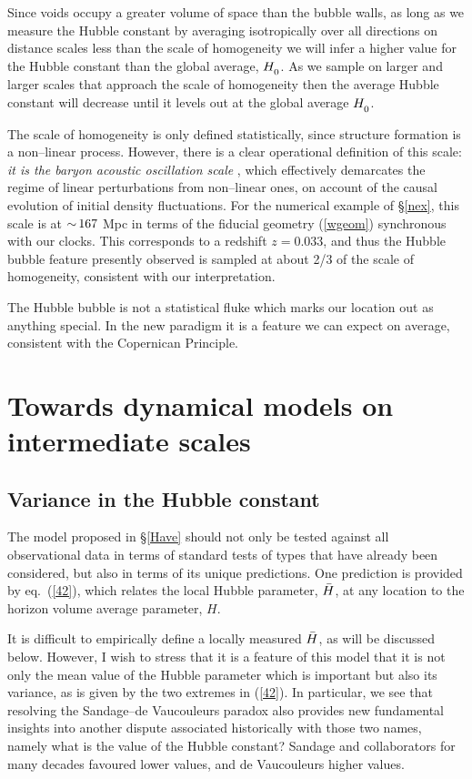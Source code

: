 \documentclass[12pt]{article}
\begin{document}
Since voids occupy a greater volume of space than the bubble walls, as
long as we measure the Hubble constant by averaging isotropically over all
directions on distance scales less than the scale of homogeneity we will
infer a higher value for the Hubble constant than the global average, $\Hm$.
As we sample on larger and larger scales that approach the scale of homogeneity
then the average Hubble constant will decrease until it levels out at
the global average $\Hm$.

The scale of homogeneity is only defined statistically, since structure
formation is a non--linear process. However, there is a clear operational
definition of this scale: {\em it is the baryon acoustic oscillation scale}
\cite{bao}, which effectively demarcates the regime of linear
perturbations from non--linear ones, on account of the causal evolution
of initial density fluctuations. For the numerical example of \S\ref{nex},
this scale is at $\mathop{\sim}\limits167$ Mpc in terms of the fiducial geometry
(\ref{wgeom}) synchronous with our clocks. This corresponds to a redshift
$z=0.033$, and thus the Hubble bubble feature presently observed is
sampled at about 2/3 of the scale of homogeneity, consistent with our
interpretation.

The Hubble bubble is not a statistical fluke which marks our location
out as anything special. In the new paradigm it is a feature we can
expect on average, consistent with the Copernican Principle.

\section{Towards dynamical models on intermediate scales\label{Newton}}

\subsection{Variance in the Hubble constant}

The model proposed in \S\ref{Have} should not only be tested against
all observational data in terms of standard tests of types that have
already been considered, but also in terms of its unique predictions.
One prediction is provided by eq.\ (\ref{42}), which relates
the local Hubble parameter, $\bH$, at any location to the
horizon volume average parameter, $H$.

It is difficult to empirically define a locally measured $\bH$, as will
be discussed below. However, I wish to stress that it is a feature of
this model that it is not only the mean value of the Hubble parameter
which is important but also its variance, as is given by the two
extremes in (\ref{42}).
In particular, we see that resolving the Sandage--de Vaucouleurs
paradox also provides new fundamental insights into another dispute
associated historically with those two names, namely what is the value of
the Hubble constant? Sandage and collaborators for many decades favoured
lower values, and de Vaucouleurs higher values.
\end{document}
